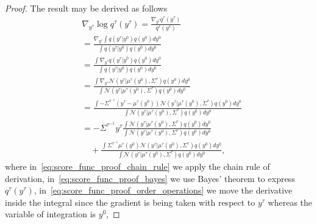 \documentclass[letterpaper, 10 pt, conference]{IEEEconf}
\begin{document}
\begin{proof}
    The result may be derived as follows
    \begin{subequations}
    \begin{align}
        & \nabla_{y^{\tau}} \log{q^{\tau}(y^{\tau})}
        = \frac{\nabla_{y^{\tau}} q^{\tau}(y^{\tau})} {q^{\tau}(y^{\tau})} \label{eq:score_func_proof_chain_rule} \\
        & = \frac{\nabla_{y^{\tau}} \int q(y^{\tau}|y^{0}) q(y^{0}) dy^{0}} {\int q(y^{\tau}|y^{0}) q(y^{0}) dy^{0}} \label{eq:score_func_proof_bayes} \\
        & = \frac{\int \nabla_{y^{\tau}} q(y^{\tau}|y^{0}) q(y^{0}) dy^{0}} {\int q(y^{\tau}|y^{0}) q(y^{0}) dy^{0}} \label{eq:score_func_proof_order_operations} \\
        & = \frac{\int \nabla_{y^{\tau}} \mathcal{N}(y^{\tau} | \mu^{\tau}(y^0), \Sigma^{\tau}) q(y^{0}) dy^{0}} {\int \mathcal{N}(y^{\tau} | \mu^{\tau}(y^0), \Sigma^{\tau}) q(y^{0}) dy^{0}} \label{eq:score_func_proof_lemma} \\
        & = \frac{\int - \Sigma^{\tau^{-1}} (y^{\tau} - \mu^{\tau}(y^0)) \mathcal{N}(y^{\tau} | \mu^{\tau}(y^0), \Sigma^{\tau}) q(y^{0}) dy^{0}} {\int \mathcal{N}(y^{\tau} | \mu^{\tau}(y^0), \Sigma^{\tau}) q(y^{0}) dy^{0}} \label{eq:score_func_proof_grad_gaussian} \\
        & = - \Sigma^{\tau^{-1}} y^{\tau} \frac{\int \mathcal{N}(y^{\tau} | \mu^{\tau}(y^0), \Sigma^{\tau}) q(y^{0}) dy^{0}} {\int \mathcal{N}(y^{\tau} | \mu^{\tau}(y^0), \Sigma^{\tau}) q(y^{0}) dy^{0}} \nonumber \\
        & \quad + \frac{\int \Sigma^{\tau^{-1}} \mu^{\tau}(y^0) \mathcal{N}(y^{\tau} | \mu^{\tau}(y^0), \Sigma^{\tau}) q(y^{0}) dy^{0}} {\int \mathcal{N}(y^{\tau} | \mu^{\tau}(y^0), \Sigma^{\tau}) q(y^{0}) dy^{0}}, \label{eq:score_func_proof_expand}
    \end{align}
    \end{subequations}
    where in~\eqref{eq:score_func_proof_chain_rule} we apply the chain rule of derivation, 
    in~\eqref{eq:score_func_proof_bayes} we use Bayes' theorem to express $q^{\tau}(y^{\tau})$, 
    in~\eqref{eq:score_func_proof_order_operations} we move the derivative inside the integral since the gradient is being taken with respect to $y^{\tau}$ whereas the variable of integration is $y^{0}$,

\end{proof}
\end{document}
